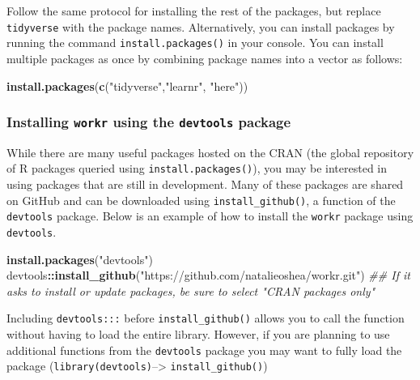 \documentclass[
]{article}
\newenvironment{Shaded}{\begin{snugshade}}{\end{snugshade}}
\newcommand{\CommentTok}[1]{\textcolor[rgb]{0.56,0.35,0.01}{\textit{#1}}}
\newcommand{\KeywordTok}[1]{\textcolor[rgb]{0.13,0.29,0.53}{\textbf{#1}}}
\newcommand{\NormalTok}[1]{#1}
\newcommand{\OperatorTok}[1]{\textcolor[rgb]{0.81,0.36,0.00}{\textbf{#1}}}
\newcommand{\StringTok}[1]{\textcolor[rgb]{0.31,0.60,0.02}{#1}}
\begin{document}
Follow the same protocol for installing the rest of the packages, but
replace \texttt{tidyverse} with the package names. Alternatively, you
can install packages by running the command \texttt{install.packages()}
in your console. You can install multiple packages as once by combining
package names into a vector as follows:

\begin{Shaded}
\begin{Highlighting}[]
\KeywordTok{install.packages}\NormalTok{(}\KeywordTok{c}\NormalTok{(}\StringTok{"tidyverse"}\NormalTok{,}\StringTok{"learnr"}\NormalTok{, }\StringTok{"here"}\NormalTok{))}
\end{Highlighting}
\end{Shaded}

\hypertarget{installing-workr-using-the-devtools-package}{%
\subsubsection{\texorpdfstring{Installing \texttt{workr} using the
\texttt{devtools}
package}{Installing workr using the devtools package}}\label{installing-workr-using-the-devtools-package}}

While there are many useful packages hosted on the CRAN (the global
repository of R packages queried using \texttt{install.packages()}), you
may be interested in using packages that are still in development. Many
of these packages are shared on GitHub and can be downloaded using
\texttt{install\_github()}, a function of the \texttt{devtools} package.
Below is an example of how to install the \texttt{workr} package using
\texttt{devtools}.

\begin{Shaded}
\begin{Highlighting}[]
\KeywordTok{install.packages}\NormalTok{(}\StringTok{"devtools"}\NormalTok{)}
\NormalTok{devtools}\OperatorTok{::}\KeywordTok{install_github}\NormalTok{(}\StringTok{"https://github.com/natalieoshea/workr.git"}\NormalTok{) }
\CommentTok{## If it asks to install or update packages, be sure to select "CRAN packages only"}
\end{Highlighting}
\end{Shaded}

Including \texttt{devtools:::} before \texttt{install\_github()} allows
you to call the function without having to load the entire library.
However, if you are planning to use additional functions from the
\texttt{devtools} package you may want to fully load the package
(\texttt{library(devtools)}--\textgreater{} \texttt{install\_github()})
\end{document}
